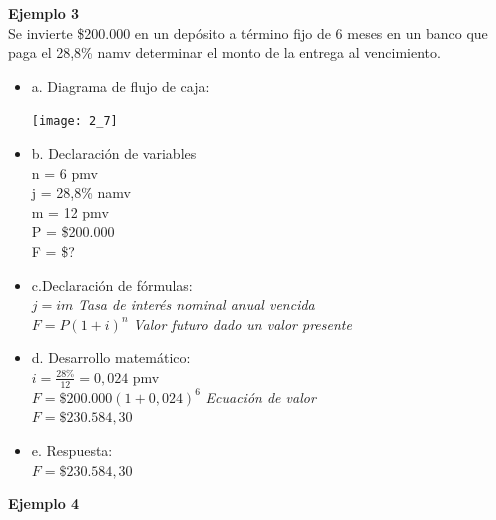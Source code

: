 \textbf{Ejemplo 3}\\

Se invierte \$200.000 en un depósito a término fijo de 6 meses en un banco que paga el 28,8\% namv determinar el monto de la entrega al vencimiento.\\

\begin{itemize}
	\item a. Diagrama de flujo de caja:\\
	
	\begin{center}
		\texttt{[image: 2\_7]}\\
	\end{center}
	
	\item b. Declaración de variables\\
	
	n = 6 pmv\\
	j = 28,8\% namv\\
	m = 12 pmv\\
	P = \$200.000\\
	F = \$?\\
	\item c.Declaración de fórmulas:\\
	
	$j = im$ \hspace{35 pt} \textit{Tasa de interés nominal anual vencida}\\
	
	$F = P(1+i)^n$ \hspace{35 pt} \textit{Valor futuro dado un valor presente}\\
	
	\item d. Desarrollo matemático:\\
	
	$i = \frac{28\%}{12} = 0,024$ pmv\\	
	$F = \$200.000 (1+0,024)^6$ \hspace{35 pt} \textit{Ecuación de valor} \\
	$F = \$230.584,30$\\
	
	\item e. Respuesta: \\
	
	$F = \$230.584,30$\\
	
\end{itemize}

\textbf{Ejemplo 4}\\

